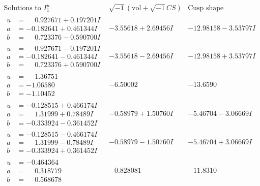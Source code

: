 \documentclass[1p]{elsarticle_modified}
\theoremstyle{definition}
\newcommand{\I}{\sqrt{-1}}
\begin{document}
$$\begin{array}{c|c|c}  
\text{Solutions to }I^u_{1}& \I (\text{vol} + \sqrt{-1}CS) & \text{Cusp shape}\\
 \hline 
\begin{aligned}
u &= \phantom{-}0.927671 + 0.197201 I \\
a &= -0.182641 + 0.461344 I \\
b &= \phantom{-}0.723376 - 0.590700 I\end{aligned}
 & -3.55618 + 2.69456 I & -12.98158 - 3.53797 I \\ \hline\begin{aligned}
u &= \phantom{-}0.927671 - 0.197201 I \\
a &= -0.182641 - 0.461344 I \\
b &= \phantom{-}0.723376 + 0.590700 I\end{aligned}
 & -3.55618 - 2.69456 I & -12.98158 + 3.53797 I \\ \hline\begin{aligned}
u &= \phantom{-}1.36751\phantom{ +0.000000I} \\
a &= -1.06580\phantom{ +0.000000I} \\
b &= -1.10452\phantom{ +0.000000I}\end{aligned}
 & -6.50002\phantom{ +0.000000I} & -13.6590\phantom{ +0.000000I} \\ \hline\begin{aligned}
u &= -0.128515 + 0.466174 I \\
a &= \phantom{-}1.31999 + 0.78489 I \\
b &= -0.333924 - 0.361452 I\end{aligned}
 & -0.58979 + 1.50760 I & -5.46704 - 3.06669 I \\ \hline\begin{aligned}
u &= -0.128515 - 0.466174 I \\
a &= \phantom{-}1.31999 - 0.78489 I \\
b &= -0.333924 + 0.361452 I\end{aligned}
 & -0.58979 - 1.50760 I & -5.46704 + 3.06669 I \\ \hline\begin{aligned}
u &= -0.464364\phantom{ +0.000000I} \\
a &= \phantom{-}0.318779\phantom{ +0.000000I} \\
b &= \phantom{-}0.568678\phantom{ +0.000000I}\end{aligned}
 & -0.828081\phantom{ +0.000000I} & -11.8310\phantom{ +0.000000I} \\ \hline\begin{aligned}

\end{aligned}
\end{array}$$
\end{document}
